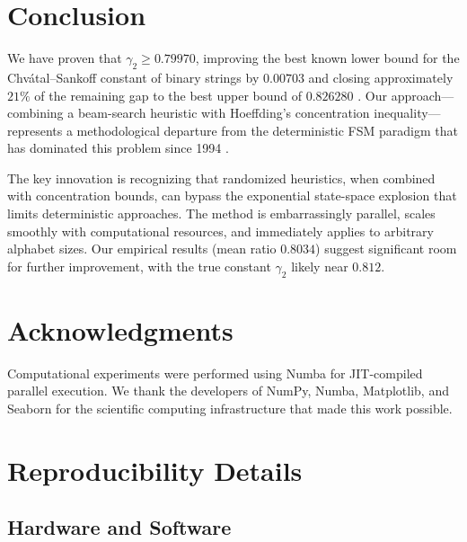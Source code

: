 \documentclass[11pt,a4paper]{article}
\theoremstyle{definition}
\begin{document}
\section{Conclusion}
\label{sec:conclusion}

We have proven that $\gamma_2 \geq 0.79970$, improving the best known lower
bound for the Chv\'{a}tal--Sankoff constant of binary strings by $0.00703$
and closing approximately $21\%$ of the remaining gap to the best upper bound
of $0.826280$ \citep{lueker2009}. Our approach---combining a beam-search
heuristic with Hoeffding's concentration inequality---represents a
methodological departure from the deterministic FSM paradigm that has dominated
this problem since 1994 \citep{dancik1994}.

The key innovation is recognizing that randomized heuristics, when combined
with concentration bounds, can bypass the exponential state-space explosion
that limits deterministic approaches. The method is embarrassingly parallel,
scales smoothly with computational resources, and immediately applies to
arbitrary alphabet sizes. Our empirical results (mean ratio $0.8034$) suggest
significant room for further improvement, with the true constant $\gamma_2$
likely near $0.812$.

\section*{Acknowledgments}

Computational experiments were performed using Numba for JIT-compiled parallel
execution. We thank the developers of NumPy, Numba, Matplotlib, and Seaborn
for the scientific computing infrastructure that made this work possible.




\appendix

\section{Reproducibility Details}
\label{app:reproducibility}

\subsection{Hardware and Software}
\end{document}
